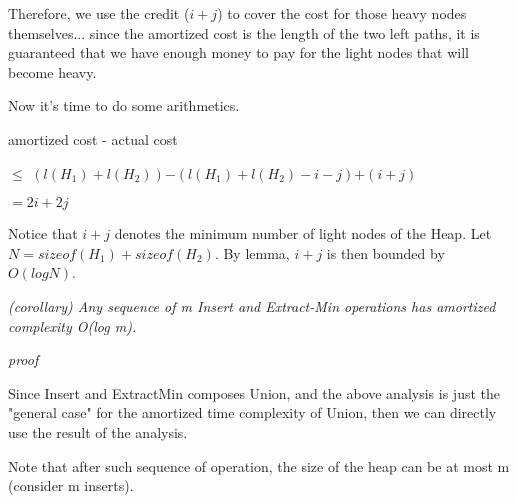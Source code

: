 \documentclass[a4paper, 10pt]{article}
\begin{document}
{\begin{addmargin}[15pt]{0in}
{Therefore, we use the credit ($i + j$) to cover the cost for those heavy nodes themselves... since the amortized cost is the length of the two left paths, it is guaranteed that we have enough money to pay for the light nodes that will become heavy.
}
\end{addmargin}

Now it's time to do some arithmetics.

amortized cost - actual cost

\hspace*{1cm}$\le$ $(l(H_1) + l(H_2))$$- (l(H_1) + l(H_2) - i - j)$$+ (i + j)$

\hspace*{1cm}$= 2i + 2j$

Notice that $i + j$ denotes the minimum number of light nodes of the Heap. Let $N = sizeof(H_1) + sizeof(H_2)$. By lemma, $i + j$ is then bounded by $O(log N)$.

{\it
(corollary) Any sequence of m Insert and Extract-Min operations has amortized complexity O(log m).
}
\begin{addmargin}[15pt]{0in}
{
\textit{proof}

Since Insert and ExtractMin composes Union, and the above analysis is just the "general case" for the amortized time complexity of Union, then we can directly use the result of the analysis. 

Note that after such sequence of operation, the size of the heap can be at most m (consider m inserts).
}
\end{addmargin}

}
~\\\\
\end{document}
